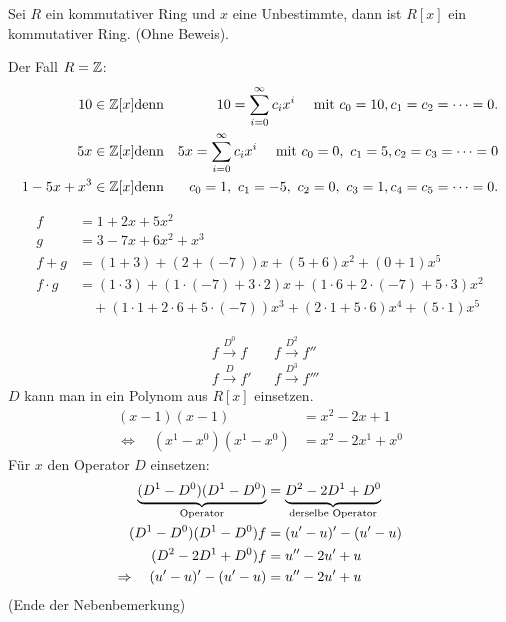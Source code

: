 \begin{propn}
	Sei $ R $ ein kommutativer Ring und $ x $ eine Unbestimmte, dann ist $ R[x] $ ein kommutativer Ring. (Ohne Beweis).
\end{propn}

\begin{bsp}
	Der Fall $ R = \mathbb Z $:
	\begin{eqnarray*}
		10 \in \mathbb Z[x] & \text{denn} & 10 = \sum_{i=0}^{\infty}c_{i}x^{i} \quad \text{ mit } c_{0} = 10, c_1 = c_2 = \cdots = 0. \\
		5x \in \mathbb Z[x] & \text{denn} & 5x = \sum_{i=0}^{\infty}c_{i}x^{i} \quad \text{ mit } c_0= 0, \ c_{1} = 5, c_2 = c_3 = \cdots = 0 \\
		1-5x+x^{3} \in \mathbb Z[x] & 
		\text{denn} & c_{0} = 1,~ c_{1} = -5, ~c_2 = 0, ~c_{3} = 1,  c_4 = c_5 = \cdots = 0.
	\end{eqnarray*}
\end{bsp}

\begin{bsp}
\begin{align*}
	f &= 1 + 2x + 5x^2 \\
	g &= 3 - 7x + 6x^2 + x^3 \\
	f + g &= (1+3) + (2+(-7))x + (5+6)x^2 + (0+1)x^5 \\
	f \cdot g &= (1 \cdot 3) + (1 \cdot (-7) + 3 \cdot 2)x + (1 \cdot 6 + 2 \cdot (-7) + 5 \cdot 3)x^2 \\
	&\quad + (1 \cdot 1 + 2 \cdot 6 + 5 \cdot (-7))x^3 + (2 \cdot 1 + 5 \cdot 6)x^4 + (5 \cdot 1)x^5
\end{align*}
\end{bsp}


\begin{bem}
	\begin{align*}
		& f \stackrel{D^0}{\longrightarrow} f && f \stackrel{D^2}{\longrightarrow} f'' \\
		& f \stackrel{D}{\longrightarrow} f' && f \stackrel{D^3}{\longrightarrow} f'''
	\end{align*}
	$ D $ kann man in ein Polynom aus $ R[x] $ einsetzen.
	\begin{align*}
		( x - 1 )( x - 1 ) &= x^2 - 2x + 1 \\
		\Leftrightarrow \quad ( x^1 - x^0 )( x^1 - x^0 ) &= x^2 - 2x^1 + x^0
	\end{align*}
	Für $ x $ den Operator $ D $ einsetzen:
	\begin{align*}
		\underbrace{(D^1 - D^0)(D^1 - D^0)}_\text{Operator} &= \underbrace{\vphantom{(D^1)} D^2 - 2D^1 + D^0}_\text{derselbe Operator} \\
		(D^1 - D^0)(D^1 - D^0)f &= (u' - u)' - (u' - u) \\
		(D^2 - 2D^1 + D^0)f &= u'' - 2u' + u \\
		\Rightarrow \quad (u' - u)' - (u' - u) &= u'' - 2u' + u
	\end{align*}
(Ende der Nebenbemerkung)
\end{bem}

